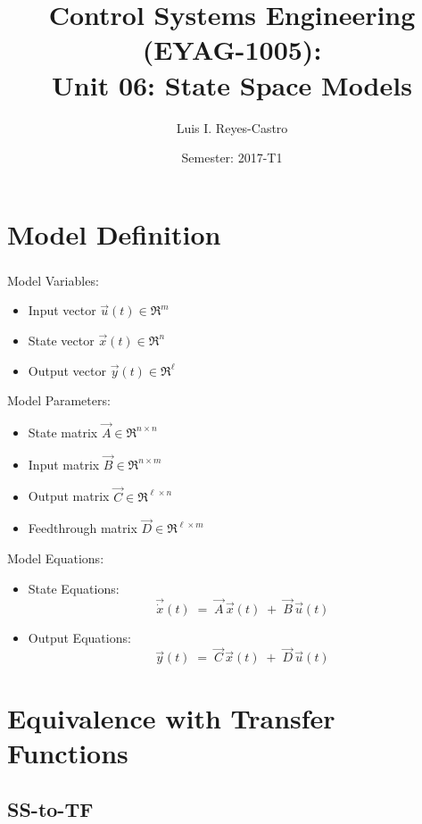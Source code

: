 \documentclass[ 10pt, xcolor = dvipsnames]{beamer}
\title[\shorttitle]{Control Systems Engineering (EYAG-1005): \\ \textbf{Unit 06:} State Space Models }
\author[L. I. Reyes-Castro]{Luis I. Reyes-Castro}
\institute[ESPOL]{\normalsize Escuela Superior Polit\'ecnica del Litoral (ESPOL) \\ Guayaquil - Ecuador}
\date[2017-T1]{Semester: 2017-T1}
\begin{document}



\section{Model Definition}

\begin{frame}[allowframebreaks]
\frametitle{\insertsection}

Model Variables: 
\begin{itemize}
\item Input vector $\vec{u}(t) \in \Re^{m}$
\item State vector $\vec{x}(t) \in \Re^{n}$
\item Output vector $\vec{y}(t) \in \Re^{\ell}$
\end{itemize}
\fullskip

Model Parameters: 
\begin{itemize}
\item State matrix $\vec{A} \in \Re^{n \times n}$
\item Input matrix $\vec{B} \in \Re^{n \times m}$
\item Output matrix $\vec{C} \in \Re^{\ell \times n}$
\item Feedthrough matrix $\vec{D} \in \Re^{\ell \times m}$
\end{itemize}
\framebreak

Model Equations: 
\begin{itemize}
\item State Equations: 
\[
\vec{\dot{x}}(t) \; = \;
\vec{A} \, \vec{x}(t) \; + \;
\vec{B} \, \vec{u}(t)
\]
\item Output Equations: 
\[
\vec{y}(t) \; = \;
\vec{C} \, \vec{x}(t) \; + \; \vec{D} \, \vec{u}(t)
\]
\end{itemize}

\end{frame}

\section{Equivalence with Transfer Functions}

\subsection{SS-to-TF}
\end{document}
